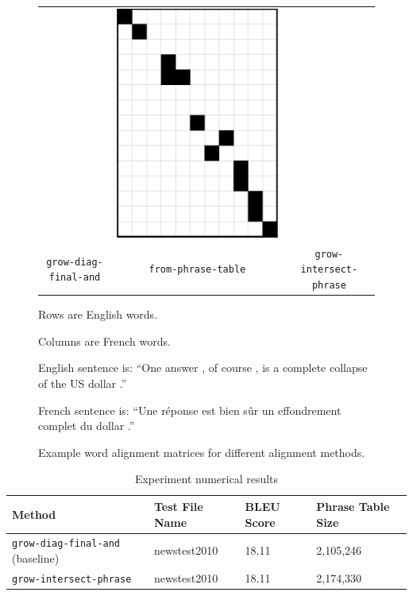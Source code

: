 \documentclass[twocolumn]{article}
\newcommand{\originalAlign}{\texttt{grow-diag-final-and}}
\newcommand{\phraseAlign}{\texttt{from-phrase-table}}
\newcommand{\phraseIntersectAlign}{\texttt{grow-intersect-phrase}}
\begin{document}
\begin{figure}[tbp]
\begin{tabular}{c c c}
    & \includegraphics[scale=0.4]{imgs/phrase-intersect-align.png} \\
      \originalAlign{}
    & \phraseAlign{}
    & \phraseIntersectAlign{}
  \end{tabular}
  \begin{center}
    Rows are English words.

    Columns are French words.

    English sentence is:
    ``One answer , of course , is a complete collapse of the US dollar .''

    French sentence is:
    ``Une r\'{e}ponse est bien s\^{u}r un effondrement complet du dollar .''
  \end{center}
  \caption{Example word alignment matrices for different alignment methods.}
  \label{fig:alignMatrices}
\end{figure}

\begin{table}[tbp]
  \begin{center}
    \begin{tabular}{| l | l | l | l |}
      \hline
      Method  &  Test File Name  &  BLEU Score  &  Phrase Table Size \\
      \hline
      \originalAlign{} (baseline)  &  newstest2010  &  18.11  &  2,105,246 \\
      \hline
      \phraseIntersectAlign{}  &  newstest2010  &  18.11  &  2,174,330 \\
      \hline
    \end{tabular}
  \end{center}
  \caption{Experiment numerical results}
  \label{table:expResults}
\end{table}
\end{document}
